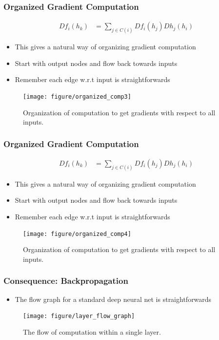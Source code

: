 \documentclass[10pt,mathserif]{beamer}
\begin{document}
\begin{frame}
  \frametitle{Organized Gradient Computation}
  \begin{align*}
    Df_{i}\left(h_k\right) &= \sum_{j \in C\left(i\right)}
    Df_{i}\left(h_{j}\right)Dh_{j}\left(h_{i}\right)
  \end{align*}
  \begin{itemize}
  \item This gives a natural way of organizing gradient computation
  \item Start with output nodes and flow back towards inputs
  \item Remember each edge w.r.t input is straightforwards
  \end{itemize}
  \begin{figure}[ht]
    \centering
    \texttt{[image: figure/organized\_comp3]}
    \caption{Organization of computation to get gradients with respect to all
      inputs. \label{fig:organized_comp3} }
  \end{figure}
\end{frame}

\begin{frame}
  \frametitle{Organized Gradient Computation}
  \begin{align*}
    Df_{i}\left(h_k\right) &= \sum_{j \in C\left(i\right)}
    Df_{i}\left(h_{j}\right)Dh_{j}\left(h_{i}\right)
  \end{align*}
  \begin{itemize}
  \item This gives a natural way of organizing gradient computation
  \item Start with output nodes and flow back towards inputs
  \item Remember each edge w.r.t input is straightforwards
  \end{itemize}
  \begin{figure}[ht]
    \centering
    \texttt{[image: figure/organized\_comp4]}
    \caption{Organization of computation to get gradients with respect to all
      inputs. \label{fig:organized_comp3} }
  \end{figure}
\end{frame}

\begin{frame}
  \frametitle{Consequence: Backpropagation}
  \begin{itemize}
  \item The flow graph for a standard deep neural net is straightforwards
  \end{itemize}
  \begin{figure}[ht]
    \centering
    \texttt{[image: figure/layer\_flow\_graph]}
    \caption{The flow of computation within a single layer. \label{fig:layer_flow_graph} }
  \end{figure}
\end{frame}
\end{document}
